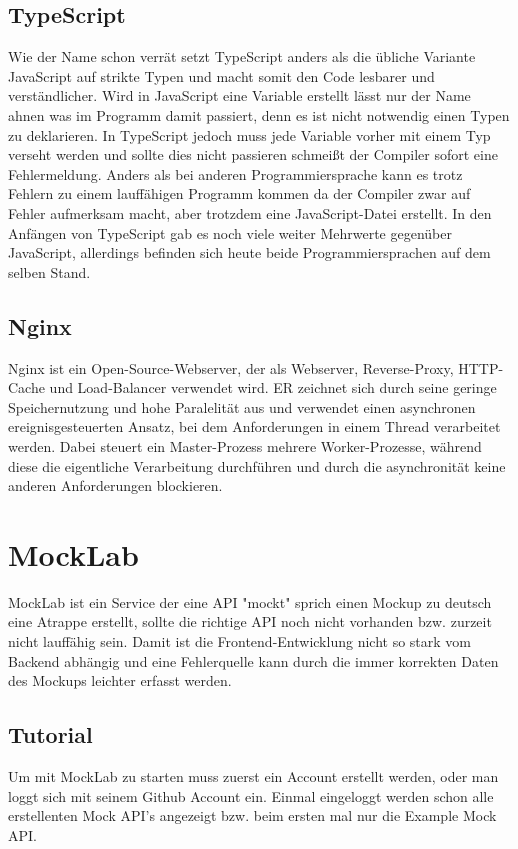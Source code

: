 \subsection{TypeScript}

Wie der Name schon verrät setzt TypeScript anders als die übliche Variante JavaScript auf strikte Typen und macht somit den Code lesbarer und verständlicher.
Wird in JavaScript eine Variable erstellt lässt nur der Name ahnen was im Programm damit passiert, denn es ist nicht notwendig einen Typen zu deklarieren.
In TypeScript jedoch muss jede Variable vorher mit einem Typ verseht werden und sollte dies nicht passieren schmeißt der Compiler sofort eine Fehlermeldung.
Anders als bei anderen Programmiersprache kann es trotz Fehlern zu einem lauffähigen Programm kommen da der Compiler zwar auf Fehler aufmerksam macht, aber
trotzdem eine JavaScript-Datei erstellt. In den Anfängen von TypeScript gab es noch viele weiter Mehrwerte gegenüber JavaScript, allerdings befinden sich heute
beide Programmiersprachen auf dem selben Stand.
\cite{sysarch-typeScript-1}

\subsection{Nginx}

Nginx ist ein Open-Source-Webserver, der als Webserver, Reverse-Proxy, HTTP-Cache und Load-Balancer verwendet wird.
ER zeichnet sich durch seine geringe Speichernutzung und hohe Paralelität aus und verwendet einen asynchronen ereignisgesteuerten
Ansatz, bei dem Anforderungen in einem Thread verarbeitet werden.
Dabei steuert ein Master-Prozess mehrere Worker-Prozesse, während diese die eigentliche Verarbeitung durchführen und durch die asynchronität keine anderen Anforderungen blockieren. 
\cite{sysarch-nginx-1}

\section{MockLab}

MockLab ist ein Service der eine API "mockt" sprich einen Mockup zu deutsch eine Atrappe erstellt, sollte die richtige API noch nicht vorhanden bzw. zurzeit nicht lauffähig sein.
Damit ist die Frontend-Entwicklung nicht so stark vom Backend abhängig und eine Fehlerquelle kann durch die immer korrekten Daten des Mockups leichter erfasst werden.
\cite{sysarch-mocklab-1} 

\subsection{Tutorial}
Um mit MockLab zu starten muss zuerst ein Account erstellt werden, oder man loggt sich mit seinem Github Account ein.
Einmal eingeloggt werden schon alle erstellenten Mock API's angezeigt bzw. beim ersten mal nur die Example Mock API.

